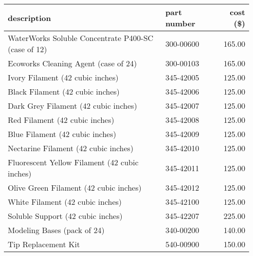 \documentclass{training}
\begin{document}
\begin{center}
\begin{tabular}{ l | l | r }
 description & part number & cost (\$) \\ \hline
 WaterWorks Soluble Concentrate P400-SC (case of 12) & 300-00600 & 165.00  \\
 Ecoworks Cleaning Agent (case of 24) & 300-00103 & 165.00 \\ \hline
 Ivory Filament (42 cubic inches) & 345-42005 & 125.00 \\
 Black Filament (42 cubic inches) & 345-42006 & 125.00 \\
 Dark Grey Filament (42 cubic inches) & 345-42007 & 125.00 \\
 Red Filament (42 cubic inches) & 345-42008 & 125.00 \\
 Blue Filament (42 cubic inches) & 345-42009 & 125.00 \\
 Nectarine Filament (42 cubic inches) & 345-42010 & 125.00 \\
 Fluorescent Yellow Filament (42 cubic inches) & 345-42011 & 125.00 \\
 Olive Green Filament (42 cubic inches) & 345-42012 & 125.00 \\
 White Filament (42 cubic inches) & 345-42100 & 125.00 \\
 Soluble Support (42 cubic inches) & 345-42207 & 225.00 \\ \hline
 Modeling Bases (pack of 24) & 340-00200 & 140.00 \\
 Tip Replacement Kit & 540-00900 & 150.00
\end{tabular}
\end{center}


\end{document}
